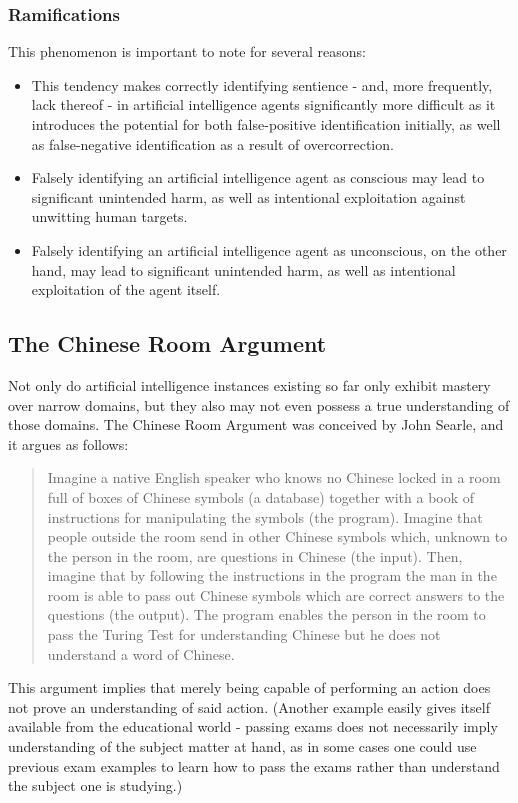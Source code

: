 \documentclass[masterthesis]{fer}
\begin{document}
\subsubsection{Ramifications}

This phenomenon is important to note for several reasons:
\begin{itemize}
\item This tendency makes correctly identifying sentience - and, more frequently, lack thereof - in artificial intelligence agents significantly more difficult as it introduces the potential for both false-positive identification initially, as well as false-negative identification as a result of overcorrection.
\item Falsely identifying an artificial intelligence agent as conscious may lead to significant unintended harm, as well as intentional exploitation against unwitting human targets.
\item Falsely identifying an artificial intelligence agent as unconscious, on the other hand, may lead to significant unintended harm, as well as intentional exploitation of the agent itself.
\end{itemize}

\subsection{The Chinese Room Argument}
Not only do artificial intelligence instances existing so far only exhibit mastery over narrow domains, but they also may not even possess a true understanding of those domains.
The Chinese Room Argument was conceived by John Searle, and it argues as follows:
\begin{quote}
Imagine a native English speaker who knows no Chinese locked in a room full of boxes of Chinese symbols (a database) together with a book of instructions for manipulating the symbols (the program). Imagine that people outside the room send in other Chinese symbols which, unknown to the person in the room, are questions in Chinese (the input). Then, imagine that by following the instructions in the program the man in the room is able to pass out Chinese symbols which are correct answers to the questions (the output). The program enables the person in the room to pass the Turing Test for understanding Chinese but he does not understand a word of Chinese.
\end{quote}
   This argument implies that merely being capable of performing an action does not prove an understanding of said action. (Another example easily gives itself available from the educational world - passing exams does not necessarily imply understanding of the subject matter at hand, as in some cases one could use previous exam examples to learn how to pass the exams rather than understand the subject one is studying.)
\end{document}
